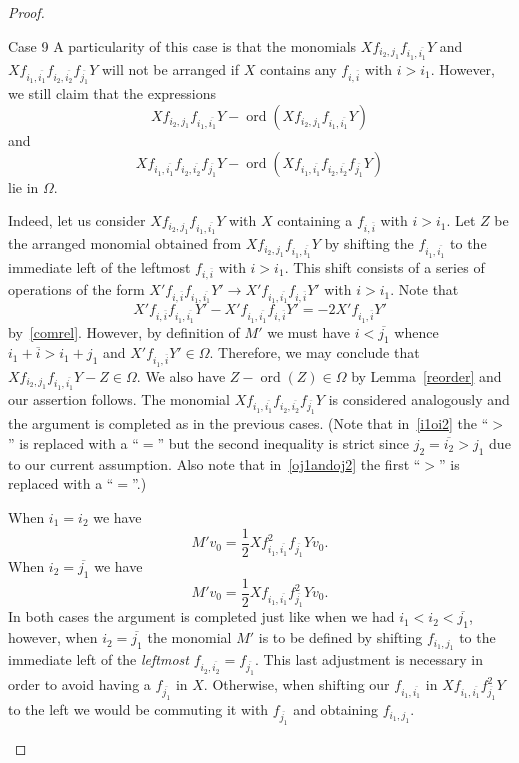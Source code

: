 \documentclass[ALCO,ThmDefs,Unicode]{cedram}
\DeclareMathOperator{\ord}{ord}
\begin{document}
\begin{proof}
\begin{enonce*}[remark]{Case 9}
A particularity of this case is that the monomials $Xf_{i_2,j_1}f_{i_1,\overline{i_1}}Y$ and\break $Xf_{i_1,\overline{i_1}}f_{i_2,\overline{i_2}}f_{\overline{j_1}}Y$ will not be arranged if $X$ contains any $f_{i,\overline i}$ with $i>i_1$. However, we still claim that the expressions
\[
Xf_{i_2,j_1}f_{i_1,\overline{i_1}}Y-\ord(Xf_{i_2,j_1}f_{i_1,\overline{i_1}}Y)
\]
and
\[
Xf_{i_1,\overline{i_1}}f_{i_2,\overline{i_2}}f_{\overline{j_1}}Y-\ord(Xf_{i_1,\overline{i_1}}f_{i_2,\overline{i_2}}f_{\overline{j_1}}Y)
\]
lie in $\Omega$.

Indeed, let us consider $Xf_{i_2,j_1}f_{i_1,\overline{i_1}}Y$ with $X$ containing a $f_{i,\overline i}$ with $i>i_1$. Let $Z$ be the arranged monomial obtained from $Xf_{i_2,j_1}f_{i_1,\overline{i_1}}Y$ by shifting the $f_{i_1,\overline{i_1}}$ to the immediate left of the leftmost $f_{i,\overline i}$ with $i>i_1$. This shift consists of a series of operations of the form $X'f_{i,\overline i}f_{i_1,\overline{i_1}}Y'\rightarrow X'f_{i_1,\overline{i_1}}f_{i,\overline i}Y'$ with $i>i_1$. Note that
\[
X'f_{i,\overline i}f_{i_1,\overline{i_1}}Y'-X'f_{i_1,\overline{i_1}}f_{i,\overline i}Y'=-2X'f_{i_1,\overline{i}}Y'
\]
by~\eqref{comrel}. However, by definition of $M'$ we must have $i<\overline{j_1}$ whence $i_1+\overline{i}>i_1+j_1$ and $X'f_{i_1,\overline{i}}Y'\in\Omega$. Therefore, we may conclude that $Xf_{i_2,j_1}f_{i_1,\overline{i_1}}Y-Z\in\Omega$. We also have $Z-\ord(Z)\in\Omega$ by Lemma~\ref{reorder} and our assertion follows. The monomial $Xf_{i_1,\overline{i_1}}f_{i_2,\overline{i_2}}f_{\overline{j_1}}Y$ is considered analogously and the argument is completed as in the previous cases. (Note that in~\eqref{i1oi2} the ``$>$'' is replaced with a ``$=$'' but the second inequality is strict since $j_2=\overline{i_2}>j_1$ due to our current assumption. Also note that in~\eqref{oj1andoj2} the first ``$>$'' is replaced with a ``$=$''.)

When $i_1=i_2$ we have
\[
M'v_0=\frac12Xf_{i_1,\overline{i_1}}^2f_{\overline{j_1}}Yv_0.
\]
When $i_2=\overline{j_1}$ we have
\[
M'v_0=\frac12Xf_{i_1,\overline{i_1}}f_{\overline{j_1}}^2Yv_0.
\]
In both cases the argument is completed just like when we had $i_1<i_2<\overline{j_1}$, however, when $i_2=\overline{j_1}$ the monomial $M'$ is to be defined by shifting $f_{i_1,j_1}$ to the immediate left of the \emph{leftmost} $f_{i_2,\overline{i_2}}=f_{\overline{j_1}}$. This last adjustment is necessary in order to avoid having a $f_{\overline{j_1}}$ in $X$. Otherwise, when shifting our $f_{i_1,\overline{i_1}}$ in $Xf_{i_1,\overline{i_1}}f_{\overline{j_1}}^2Y$ to the left we would be commuting it with $f_{\overline{j_1}}$ and obtaining $f_{i_1,j_1}$.


\end{enonce*}
\end{proof}
\end{document}
